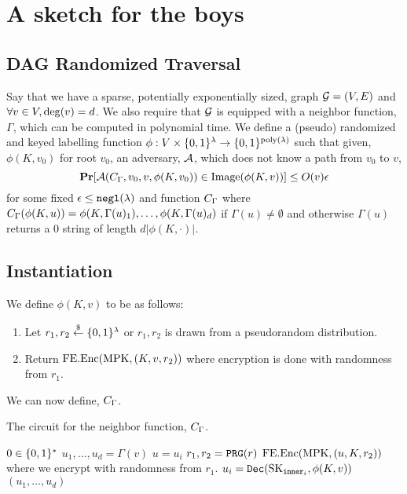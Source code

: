 \section{A sketch for the boys}
\newcommand{\labelFunc}{\phi}
\newcommand{\imageFn}{\text{Image}}

\subsection{DAG Randomized Traversal}
Say that we have a sparse, potentially exponentially sized, graph $\mathcal{G} = (V, E)$
and $\forall v \in V, \deg(v) = d$.
We also require that $\mathcal{G}$ is equipped with a neighbor function, $\Gamma$, which can be computed in polynomial time.
We define a (pseudo) randomized and keyed labelling function $\phi: V \times \{0,1\}^\lambda \rightarrow \{0,1\}^{\operatorname{poly}(\lambda)}$ 
such that given, $\phi(K, v_0)$ for root $v_0$, an adversary, $\mathcal{A}$, which does not know a path from $v_0$ to $v$,
\begin{equation}
	\label{eq:guessPhi}
	\Pr[\advers(\circNeigb, v_0, v, \labelFunc(K, v_0)) \in \imageFn(\labelFunc(K, v))] \leq O(v)\eps
\end{equation}
for some fixed $\epsilon \leq \texttt{negl}(\lambda)$ and function $C_\Gamma$ where $\circNeigb(\labelFunc(K, u)) = \labelFunc(K, \Gamma(u)_1), \dots, \labelFunc(K, \Gamma(u)_d)$
if $\Gamma(u) \neq \emptyset$ and otherwise $\Gamma(u)$ returns a $0$ string of length $d |\labelFunc(K, \cdot)|$.

\subsection{Instantiation}
We define $\labelFunc(K, v)$ to be as follows:
\begin{enumerate}
	\item Let $r_1, r_2 \overset{\$}{\gets} \{0,1\}^\lambda$ or $r_1, r_2$ is drawn from a pseudorandom distribution. %
	\item Return $\text{FE.Enc}(\text{MPK}, (K, v, r_2))$ where encryption is done with randomness from $r_1$.
\end{enumerate}

We can now define, $C_\Gamma$.
\begin{algorithm}[H]
	\caption{
		The circuit for the neighbor function, $C_\Gamma$.
	}
	\begin{algorithmic}[1]
				\State \Return $0 \in \{0,1\}^*$ %
			\EndIf
			\State $u_1, \dots, u_d = \Gamma(v)$
			\State $u = u_i$
			\State $r_1, r_2 = \texttt{PRG}(r)$
			\label{alg:neighb:prg}
			\State \Return $\text{FE.Enc}(\text{MPK}, (u, K, r_2))$ where we encrypt with randomness from $r_1$.
		\EndFunction
				\State $u_i = \texttt{Dec}(\text{SK}_{\texttt{inner}_i}, \phi(K, v))$
			\EndFor
			\State \Return $(u_1, \dots, u_d)$
		\EndFunction
	\end{algorithmic}
	\label{alg:neighb}
\end{algorithm}

